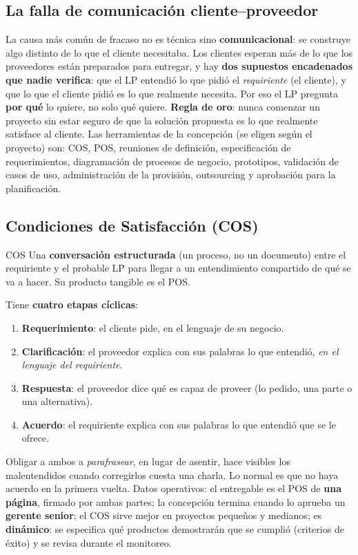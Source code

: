\documentclass[11pt,a4paper]{article}
\begin{document}
\subsection{La falla de comunicación cliente--proveedor}
La causa más común de fracaso no es técnica sino \textbf{comunicacional}: se construye algo distinto de lo que
el cliente necesitaba. Los clientes esperan más de lo que los proveedores están preparados para entregar, y
hay \textbf{dos supuestos encadenados que nadie verifica}: que el LP entendió lo que pidió el
\emph{requiriente} (el cliente), y que lo que el cliente pidió es lo que realmente necesita. Por eso el LP
pregunta \textbf{por qué} lo quiere, no solo qué quiere. \textbf{Regla de oro}: nunca comenzar un proyecto sin
estar seguro de que la solución propuesta es lo que realmente satisface al cliente. Las herramientas de la
concepción (se eligen según el proyecto) son: COS, POS, reuniones de definición, especificación de
requerimientos, diagramación de procesos de negocio, prototipos, validación de casos de uso, administración de
la provisión, outsourcing y aprobación para la planificación.

\subsection{Condiciones de Satisfacción (COS)}
\begin{defbox}{COS}
Una \textbf{conversación estructurada} (un proceso, no un documento) entre el requiriente y el probable LP para
llegar a un entendimiento compartido de qué se va a hacer. Su producto tangible es el POS.
\end{defbox}
Tiene \textbf{cuatro etapas cíclicas}:
\begin{enumerate}
  \item \textbf{Requerimiento}: el cliente pide, en el lenguaje de su negocio.
  \item \textbf{Clarificación}: el proveedor explica con sus palabras lo que entendió, \emph{en el lenguaje del
  requiriente}.
  \item \textbf{Respuesta}: el proveedor dice qué es capaz de proveer (lo pedido, una parte o una alternativa).
  \item \textbf{Acuerdo}: el requiriente explica con sus palabras lo que entendió que se le ofrece.
\end{enumerate}
Obligar a ambos a \emph{parafrasear}, en lugar de asentir, hace visibles los malentendidos cuando corregirlos
cuesta una charla. Lo normal es que no haya acuerdo en la primera vuelta. Datos operativos: el entregable es el
POS de \textbf{una página}, firmado por ambas partes; la concepción termina cuando lo aprueba un \textbf{gerente
senior}; el COS sirve mejor en proyectos pequeños y medianos; es \textbf{dinámico}: se especifica qué productos
demostrarán que se cumplió (criterios de éxito) y se revisa durante el monitoreo.
\end{document}
